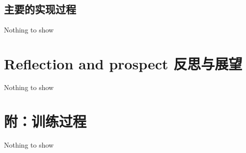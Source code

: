 \documentclass[a4paper]{article}
\begin{document}
	\subsection{主要的实现过程}
	Nothing to show
	
	
	\section{Reflection and prospect 反思与展望}
	Nothing to show
	
	\section{附：训练过程}
	Nothing to show
\end{document}
